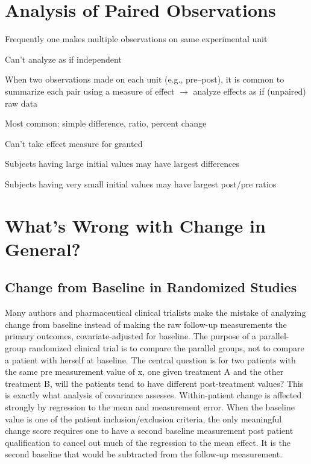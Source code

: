 \section{Analysis of Paired Observations}
\bi
\item   Frequently one makes multiple observations on same
experimental unit
\item   Can't analyze as if independent
\item   When two observations made on each unit (e.g., pre--post),
        it is common to summarize each pair using a measure of effect
        $\rightarrow$ analyze effects as if (unpaired) raw data
\item   Most common: simple difference, ratio, percent change
\item   Can't take effect measure for granted
\item   Subjects having large initial values may have largest
        differences
\item   Subjects having very small initial values may have
        largest post/pre ratios
\ei

\section{What's Wrong with Change in General?}
\subsection{Change from Baseline in Randomized Studies}
Many authors and pharmaceutical clinical trialists make the mistake of analyzing change from baseline instead of making the raw follow-up measurements the primary outcomes, covariate-adjusted for baseline.  The purpose of a parallel-group randomized clinical trial is to compare the parallel groups, not to compare a patient with herself at baseline. The central question is for two patients with the same pre measurement value of x, one given treatment A and the other treatment B, will the patients tend to have different post-treatment values? This is exactly what analysis of covariance assesses.  Within-patient change is affected strongly by regression to the mean and measurement error.  When the baseline value is one of the patient inclusion/exclusion criteria, the only meaningful change score requires one to have a second baseline measurement post patient qualification to cancel out much of the regression to the mean effect.  It is the second baseline that would be subtracted from the follow-up measurement.

